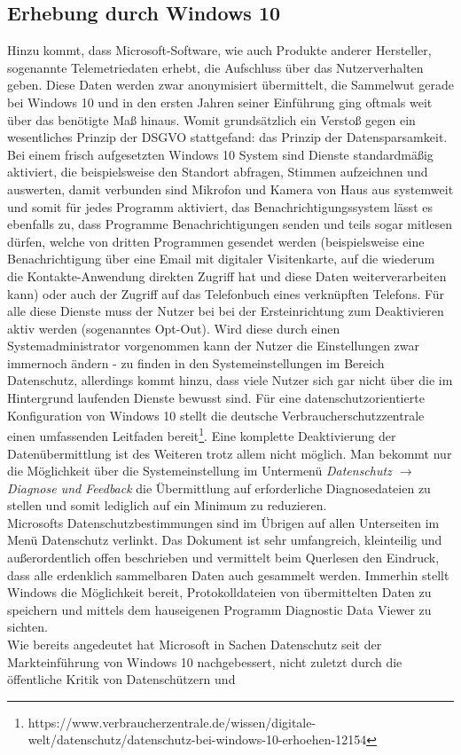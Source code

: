 \subsection{Erhebung durch Windows 10}
Hinzu kommt, dass Microsoft-Software, wie auch Produkte anderer Hersteller, sogenannte Telemetriedaten erhebt, die Aufschluss über das Nutzerverhalten geben. Diese Daten werden zwar anonymisiert übermittelt, die Sammelwut gerade bei Windows 10 und in den ersten Jahren seiner Einführung ging oftmals weit über das benötigte Maß hinaus. Womit grundsätzlich ein Verstoß gegen ein wesentliches Prinzip der DSGVO stattgefand: das Prinzip der Datensparsamkeit. Bei einem frisch aufgesetzten Windows 10 System sind Dienste standardmäßig aktiviert, die beispielsweise den Standort abfragen, Stimmen aufzeichnen und auswerten, damit verbunden sind Mikrofon und Kamera von Haus aus systemweit und somit für jedes Programm aktiviert, das Benachrichtigungssystem lässt es ebenfalls zu, dass Programme Benachrichtigungen senden und teils sogar mitlesen dürfen, welche von dritten Programmen gesendet werden (beispielsweise eine Benachrichtigung über eine Email mit digitaler Visitenkarte, auf die wiederum die Kontakte-Anwendung direkten Zugriff hat und diese Daten weiterverarbeiten kann) oder auch der Zugriff auf das Telefonbuch eines verknüpften Telefons. Für alle diese Dienste muss der Nutzer bei bei der Ersteinrichtung zum Deaktivieren aktiv werden (sogenanntes Opt-Out). Wird diese durch einen Systemadministrator vorgenommen kann der Nutzer die Einstellungen zwar immernoch ändern - zu finden in den Systemeinstellungen im Bereich \glqq Datenschutz\grqq{}, allerdings kommt hinzu, dass viele Nutzer sich gar nicht über die im Hintergrund laufenden Dienste bewusst sind. Für eine datenschutzorientierte Konfiguration von Windows 10 stellt die deutsche Verbraucherschutzzentrale einen umfassenden Leitfaden bereit\footnote{https://www.verbraucherzentrale.de/wissen/digitale-welt/datenschutz/datenschutz-bei-windows-10-erhoehen-12154}. Eine komplette Deaktivierung der Datenübermittlung ist des Weiteren trotz allem nicht möglich. Man bekommt nur die Möglichkeit über die Systemeinstellung im Untermenü \textit{Datenschutz $\rightarrow$ Diagnose und Feedback} die Übermittlung auf \glqq erforderliche Diagnosedateien\grqq{} zu stellen und somit lediglich auf ein Minimum zu reduzieren.\\
Microsofts Datenschutzbestimmungen sind im Übrigen auf allen Unterseiten im Menü \glqq Datenschutz\grqq{} verlinkt. Das Dokument ist sehr umfangreich, kleinteilig und außerordentlich offen beschrieben und vermittelt beim Querlesen den Eindruck, dass alle erdenklich sammelbaren Daten auch gesammelt werden. Immerhin stellt Windows die Möglichkeit bereit, Protokolldateien von übermittelten Daten zu speichern und mittels dem hauseigenen Programm \glqq Diagnostic Data Viewer\grqq{} zu sichten.\\
Wie bereits angedeutet hat Microsoft in Sachen Datenschutz seit der Markteinführung von Windows 10 nachgebessert, nicht zuletzt durch die öffentliche Kritik von Datenschützern und 

